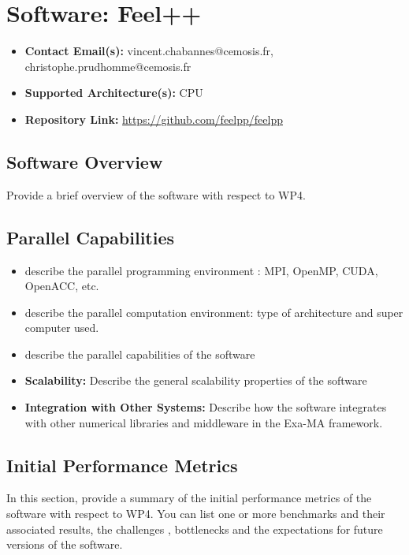 \section{Software: Feel++}
\label{sec:WP4:Feel++:software}

\begin{itemize}
    \item \textbf{Contact Email(s):} vincent.chabannes@cemosis.fr, christophe.prudhomme@cemosis.fr
    \item \textbf{Supported Architecture(s):} CPU
    \item \textbf{Repository Link:} \href{https://github.com/feelpp/feelpp}{https://github.com/feelpp/feelpp}
\end{itemize}

\subsection{Software Overview}
\label{sec:WP4:Feel++:summary}

Provide a brief overview of the software with respect to WP4.

\subsection{Parallel Capabilities}
\label{sec:WP4:Feel++:performances}


\begin{itemize}
    \item describe the parallel programming  environment : MPI, OpenMP, CUDA, OpenACC, etc.
    \item describe the parallel computation environment: type of architecture and super computer used.
    \item describe the parallel capabilities of the software
    \item \textbf{Scalability:} Describe the general scalability properties of the software
    \item \textbf{Integration with Other Systems:} Describe how the software integrates with other numerical libraries and middleware in the Exa-MA framework.
\end{itemize}

\subsection{Initial Performance Metrics}
\label{sec:WP4:Feel++:metrics}

In this section, provide a summary of the initial performance metrics of the software with respect to WP4.
You can list one or more benchmarks and their associated results, the challenges , bottlenecks and the expectations for future versions of the software.



